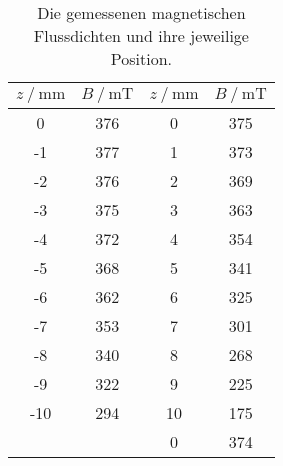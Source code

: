\begin{table}
  \centering
  \caption{Die gemessenen magnetischen Flussdichten und ihre jeweilige Position.}
  \label{tab:flussmessung}
  \begin{tabular}{S[table-format=+2.0] S | S[table-format=+2.0] S}
  \toprule
    {$z\:/\:\si{\milli\meter}$} & {$B\:/\:\si{\milli\tesla}$} &
    {$z\:/\:\si{\milli\meter}$} & {$B\:/\:\si{\milli\tesla}$} \\
   & 376 & 0 & 375 \\
  -1 & 377 & 1 & 373 \\
  -2 & 376 & 2 & 369 \\
  -3 & 375 & 3 & 363 \\
  -4 & 372 & 4 & 354 \\
  -5 & 368 & 5 & 341 \\
  -6 & 362 & 6 & 325 \\
  -7 & 353 & 7 & 301 \\
  -8 & 340 & 8 & 268 \\
  -9 & 322 & 9 & 225 \\
  -10 & 294 & 10 & 175\\
   & & 0 & 374 \\
\end{tabular}
\end{table}
